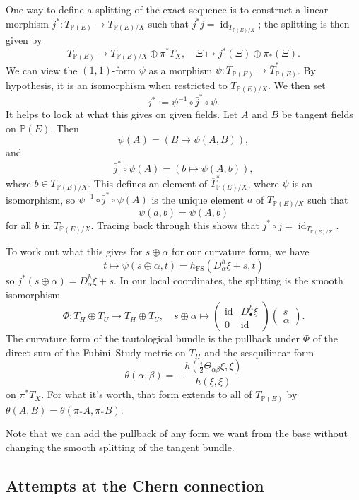 \documentclass[11pt]{article}
\theoremstyle{definition}
\newcommand{\kk}[1]{\mathbb{#1}}
\DeclareMathOperator{\id}{id}
\begin{document}
One way to define a splitting of the exact sequence is to construct a linear morphism $j^* : T_{\kk P(E)} \to T_{\kk P(E)/X}$ such that $j^* j = \id_{T_{\kk P(E)/X}}$; the splitting is then given by
$$
T_{\kk P(E)} \to T_{\kk P(E)/X} \oplus \pi^*T_X,
\quad
\Xi \mapsto j^*(\Xi) \oplus \pi_*(\Xi).
$$
We can view the $(1,1)$-form $\psi$ as a morphism $\psi : T_{\kk P(E)} \to \overline{T}_{\kk P(E)}^*$. By hypothesis, it is an isomorphism when restricted to $T_{\kk P(E)/X}$. We then set
$$
j^* := \psi^{-1} \circ \bar{j}^* \circ \psi.
$$
It helps to look at what this gives on given fields. Let $A$ and $B$ be tangent fields on $\kk P(E)$. Then
$$
\psi(A) = (B \mapsto \psi(A, B)),
$$
and
$$
\bar j^* \circ \psi(A) = (b \mapsto \psi(A, b)),
$$
where $b \in T_{\kk P(E)/X}$. This defines an element of $\overline T_{\kk P(E)/X}^*$, where $\psi$ is an isomorphism, so $\psi^{-1} \circ \bar j^* \circ \psi(A)$ is the unique element $a$ of $T_{\kk P(E)/X}$ such that
$$
\psi(a, b) = \psi(A, b)
$$
for all $b$ in $T_{\kk P(E)/X}$. Tracing back through this shows that $j^* \circ j = \id_{T_{\kk P(E)/X}}$.

To work out what this gives for $s \oplus \alpha$ for our curvature form, we have
$$
t \mapsto \psi(s \oplus \alpha, t) = h_{\mathrm{FS}}(D^h_\alpha \xi + s, t)
$$
so $j^*(s \oplus \alpha) = D^h_\alpha \xi + s$. In our local coordinates, the splitting is the smooth isomorphism
$$
\Phi: T_H \oplus T_U \to T_H \oplus T_U,
\quad
s \oplus \alpha
\mapsto
\begin{pmatrix}
  \id & D^h_\bullet \xi
  \\
  0 & \id
\end{pmatrix}
\begin{pmatrix}
  s \\ \alpha
\end{pmatrix}.
$$
The curvature form of the tautological bundle is the pullback under $\Phi$ of the direct sum of the Fubini--Study metric on $T_H$ and the sesquilinear form
$$
\theta(\alpha, \beta) = -\frac{h(\frac i2\Theta_{\alpha\beta}\xi, \xi)}{h(\xi,\xi)}
$$
on $\pi^*T_X$. For what it's worth, that form extends to all of $T_{\kk P(E)}$ by $\theta(A, B) = \theta(\pi_*A, \pi_*B)$.

Note that we can add the pullback of any form we want from the base without changing the smooth splitting of the tangent bundle.

\subsection{Attempts at the Chern connection}
\end{document}
